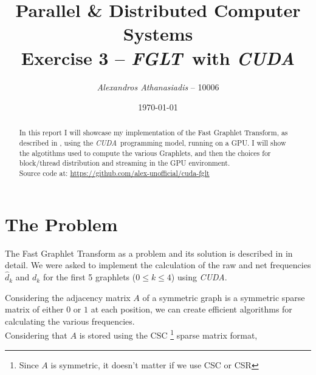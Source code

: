 \documentclass[10pt, a4paper]{article}
\newcommand{\cuda}{\textit{CUDA}}
\newcommand{\fglt}{\textit{FGLT}}
\begin{document}
\title{
	\textbf{Parallel \& Distributed Computer Systems}\\
	Exercise 3 -- \fglt \ with \cuda
}

\author{\textit{Alexandros Athanasiadis} -- 10006}
\date{\today}

\maketitle

\begin{abstract}
	In this report I will showcase my implementation of the Fast Graphlet Transform, as described in
	\cite{floros2020}, using the \cuda \ programming model, running on a GPU. I will show the algotithms
	used to compute the various Graphlets, and then the choices for block/thread distribution and streaming
	in the GPU environment. \\

	\noindent
	Source code at: \url{https://github.com/alex-unofficial/cuda-fglt}
\end{abstract}

\section{The Problem}
The Fast Graphlet Transform as a problem and its solution is described in \cite{floros2020} in detail. We were
asked to implement the calculation of the raw and net frequencies $\hat{d}_k$ and $d_k$ for the first 5 
graphlets ($0 \leq k \leq 4$) using \cuda.

Considering the adjacency matrix $A$ of a symmetric graph is a symmetric sparse matrix of 
either $0$ or $1$ at each position, we can create efficient algorithms for calculating the 
various frequencies. \\

Considering that $A$ is stored using the CSC 
\footnote{Since $A$ is symmetric, it doesn't matter if we use CSC or CSR}
sparse matrix format,
\end{document}
